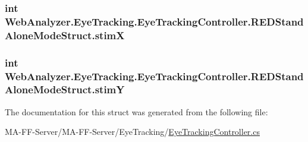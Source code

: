 \subsubsection[{stim\+X}]{\setlength{\rightskip}{0pt plus 5cm}int Web\+Analyzer.\+Eye\+Tracking.\+Eye\+Tracking\+Controller.\+R\+E\+D\+Stand\+Alone\+Mode\+Struct.\+stim\+X}\label{struct_web_analyzer_1_1_eye_tracking_1_1_eye_tracking_controller_1_1_r_e_d_stand_alone_mode_struct_aa155f1c99fa1d08ee3c65ac0a1363671}
\hypertarget{struct_web_analyzer_1_1_eye_tracking_1_1_eye_tracking_controller_1_1_r_e_d_stand_alone_mode_struct_a46cc02eae0a855e5eb072465c2f71b20}{}
\subsubsection[{stim\+Y}]{\setlength{\rightskip}{0pt plus 5cm}int Web\+Analyzer.\+Eye\+Tracking.\+Eye\+Tracking\+Controller.\+R\+E\+D\+Stand\+Alone\+Mode\+Struct.\+stim\+Y}\label{struct_web_analyzer_1_1_eye_tracking_1_1_eye_tracking_controller_1_1_r_e_d_stand_alone_mode_struct_a46cc02eae0a855e5eb072465c2f71b20}


The documentation for this struct was generated from the following file\+:\begin{DoxyCompactItemize}
\item 
M\+A-\/\+F\+F-\/\+Server/\+M\+A-\/\+F\+F-\/\+Server/\+Eye\+Tracking/\hyperlink{_eye_tracking_controller_8cs}{Eye\+Tracking\+Controller.\+cs}\end{DoxyCompactItemize}
